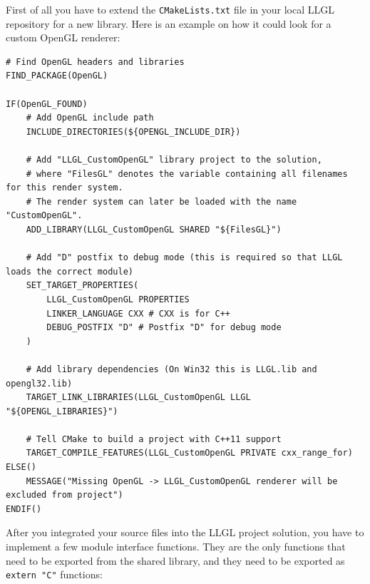 \documentclass{article}
\begin{document}
First of all you have to extend the \texttt{CMakeLists.txt} file in your local LLGL repository for a new library.
Here is an example on how it could look for a custom OpenGL renderer:
\begin{lstlisting}[language=cmakeLanguage]
# Find OpenGL headers and libraries
FIND_PACKAGE(OpenGL)

IF(OpenGL_FOUND)
	# Add OpenGL include path
	INCLUDE_DIRECTORIES(${OPENGL_INCLUDE_DIR})
	
	# Add "LLGL_CustomOpenGL" library project to the solution,
	# where "FilesGL" denotes the variable containing all filenames for this render system.
	# The render system can later be loaded with the name "CustomOpenGL".
	ADD_LIBRARY(LLGL_CustomOpenGL SHARED "${FilesGL}")
	
	# Add "D" postfix to debug mode (this is required so that LLGL loads the correct module)
	SET_TARGET_PROPERTIES(
		LLGL_CustomOpenGL PROPERTIES
		LINKER_LANGUAGE CXX # CXX is for C++
		DEBUG_POSTFIX "D" # Postfix "D" for debug mode
	)
	
	# Add library dependencies (On Win32 this is LLGL.lib and opengl32.lib)
	TARGET_LINK_LIBRARIES(LLGL_CustomOpenGL LLGL "${OPENGL_LIBRARIES}")
	
	# Tell CMake to build a project with C++11 support
	TARGET_COMPILE_FEATURES(LLGL_CustomOpenGL PRIVATE cxx_range_for)
ELSE()
	MESSAGE("Missing OpenGL -> LLGL_CustomOpenGL renderer will be excluded from project")
ENDIF()
\end{lstlisting}
After you integrated your source files into the LLGL project solution,
you have to implement a few module interface functions.
They are the only functions that need to be exported from the shared library,
and they need to be exported as \texttt{extern "C"} functions:
\end{document}
